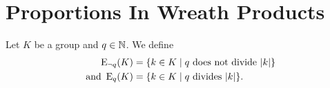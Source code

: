 \section{Proportions In Wreath Products}

\begin{defn}
Let $K$ be a group and $q\in \operatorname{\mathbb{N}}$.
We define
\begin{align*}
\operatorname{E}_{\neg q}(K)&=\{k \in K\mid q \text{ does not divide } |k|\}\\
\text{ and } \operatorname{E}_{q}(K)&=\{k \in K\mid q \text{ divides } |k|\}.
\end{align*}
\end{defn}


